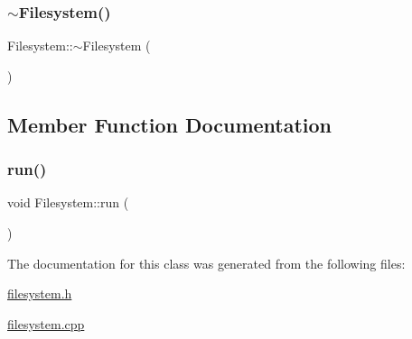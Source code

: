 \subsubsection{\texorpdfstring{$\sim$\+Filesystem()}{~Filesystem()}}
{\footnotesize\ttfamily Filesystem\+::$\sim$\+Filesystem (\begin{DoxyParamCaption}{ }\end{DoxyParamCaption})\hspace{0.3cm}{\ttfamily [inline]}}



\subsection{Member Function Documentation}
\mbox{\label{class_filesystem_a373c34da491ec8d269cbc18d52a1ad79}} 
\subsubsection{\texorpdfstring{run()}{run()}}
{\footnotesize\ttfamily void Filesystem\+::run (\begin{DoxyParamCaption}{ }\end{DoxyParamCaption})}



The documentation for this class was generated from the following files\+:\begin{DoxyCompactItemize}
\item 
\hyperlink{filesystem_8h}{filesystem.\+h}\item 
\hyperlink{filesystem_8cpp}{filesystem.\+cpp}\end{DoxyCompactItemize}
